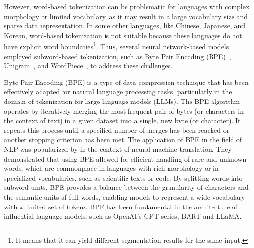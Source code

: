However, word-based tokenization can be problematic for languages with complex morphology or limited vocabulary, as it may result in a large vocabulary size and sparse data representation.
In some other languages, like Chinese, Japanese, and Korean, word-based tokenization is not suitable because these languages do not have explicit word boundaries\footnote{It means that it can yield different segmentation results for the same input.}.
Thus, several neural network-based models employed subword-based tokenization, such as Byte Pair Encoding (BPE)~\cite{sennrich2016neural}, Unigram~\cite{kudo2018sentencepiece}, and WordPiece~\cite{wu2016google}, to address these challenges.

Byte Pair Encoding (BPE) is a type of data compression technique that has been effectively adapted for natural language processing tasks, particularly in the domain of tokenization for large language models (LLMs).
The BPE algorithm operates by iteratively merging the most frequent pair of bytes (or characters in the context of text) in a given dataset into a single, new byte (or character). It repeats this process until a specified number of merges has been reached or another stopping criterion has been met.
The application of BPE in the field of NLP was popularized by \textcite{sennrich2016neural} in the context of neural machine translation.
They demonstrated that using BPE allowed for efficient handling of rare and unknown words, which are commonplace in languages with rich morphology or in specialized vocabularies, such as scientific texts or code.
By splitting words into subword units, BPE provides a balance between the granularity of characters and the semantic units of full words, enabling models to represent a wide vocabulary with a limited set of tokens.
BPE has been fundamental in the architecture of influential language models, such as OpenAI's GPT series, BART and LLaMA\@.

